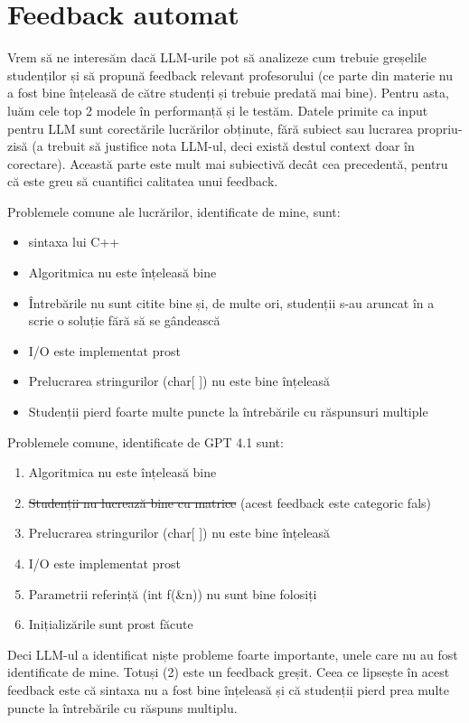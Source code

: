 \documentclass[12pt, a4paper]{report}
\begin{document}
\section{Feedback automat}
Vrem să ne interesăm dacă LLM-urile pot să analizeze cum trebuie greșelile studenților
și să propună feedback relevant profesorului (ce parte din materie nu a fost bine înțeleasă de către studenți și trebuie predată mai bine).
Pentru asta, luăm cele top 2 modele în performanță și le testăm. Datele primite ca input pentru LLM sunt corectările lucrărilor obținute, fără subiect sau lucrarea propriu-zisă (a trebuit să justifice nota LLM-ul, deci există destul context doar în corectare).
Această parte este mult mai subiectivă decât cea precedentă, pentru că este greu să cuantifici calitatea unui feedback.

Problemele comune ale lucrărilor, identificate de mine, sunt:
\begin{itemize}
\item sintaxa lui C++
\item Algoritmica nu este înțeleasă bine
\item Întrebările nu sunt citite bine și, de multe ori, studenții s-au aruncat în a scrie o soluție fără să se gândească
\item I/O este implementat prost
\item Prelucrarea stringurilor (char[ ]) nu este bine înțeleasă
\item Studenții pierd foarte multe puncte la întrebările cu răspunsuri multiple
\end{itemize}

Problemele comune, identificate de GPT 4.1 sunt:
\begin{enumerate}
\item Algoritmica nu este înțeleasă bine
\item \st{Studenții nu lucrează bine cu matrice} (acest feedback este categoric fals)
\item Prelucrarea stringurilor (char[ ]) nu este bine înțeleasă
\item I/O este implementat prost
\item Parametrii referință (int f(&n)) nu sunt bine folosiți
\item Inițializările sunt prost făcute
\end{enumerate}

Deci LLM-ul a identificat niște probleme foarte importante, unele care nu au fost identificate de mine. Totuși (2) este un feedback greșit.
Ceea ce lipsește în acest feedback este că sintaxa nu a fost bine înțeleasă și că studenții pierd prea multe puncte la întrebările cu răspuns multiplu.
\end{document}
